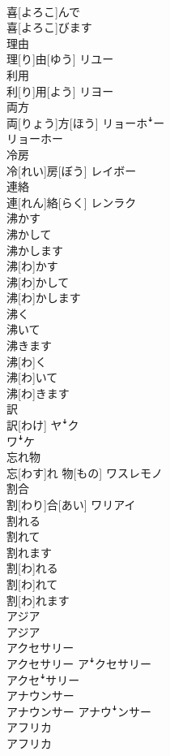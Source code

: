 \documentclass[8pt]{extreport}
\begin{document}
\begin{CJK}{UTF8}{min}
\\	喜[よろこ]んで 
\\	喜[よろこ]びます	
\\	理由	
\\	理[り]由[ゆう]	リユー
\\	利用	
\\	利[り]用[よう]	リヨー
\\	両方	
\\	両[りょう]方[ほう]	リョーホꜜー 
\\	リョーホー
\\	冷房	
\\	冷[れい]房[ぼう]	レイボー
\\	連絡	
\\	連[れん]絡[らく]	レンラク
\\	沸かす 
\\	沸かして 
\\	沸かします	
\\	沸[わ]かす 
\\	沸[わ]かして 
\\	沸[わ]かします	
\\	沸く 
\\	沸いて 
\\	沸きます	
\\	沸[わ]く 
\\	沸[わ]いて 
\\	沸[わ]きます	
\\	訳	
\\	訳[わけ]	ヤꜜク 
\\	ワꜜケ
\\	忘れ物	
\\	忘[わす]れ 物[もの]	ワスレモノ
\\	割合	
\\	割[わり]合[あい]	ワリアイ
\\	割れる 
\\	割れて 
\\	割れます	
\\	割[わ]れる 
\\	割[わ]れて 
\\	割[わ]れます	
\\	アジア	
\\	アジア	
\\	アクセサリー	
\\	アクセサリー	アꜜクセサリー 
\\	アクセꜜサリー
\\	アナウンサー	
\\	アナウンサー	アナウꜜンサー
\\	アフリカ	
\\	アフリカ	

\end{CJK}
\end{document}
